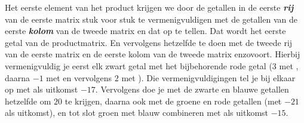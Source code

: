 Het eerste element van het product krijgen we door de getallen in de eerste \textit{\textbf{rij}} van de eerste matrix stuk voor stuk te vermenigvuldigen met de getallen van de eerste \textit{\textbf{kolom}} van de tweede matrix en dat op te tellen. Dat wordt het eerste getal van de productmatrix. En vervolgens hetzelfde te doen met de tweede rij van de eerste matrix en de eerste kolom van de tweede matrix enzovoort. 
Hierbij vermenigvuldig je eerst elk zwart getal  met het bijbehorende rode getal ($3$ met , daarna $-1$ met   en vervolgens $2$ met ). Die vermenigvuldigingen  tel je bij elkaar  op met als uitkomst $-17$. Vervolgens doe je met de zwarte en blauwe getallen  hetzelfde om $20$ te krijgen, daarna ook met de groene en rode getallen  (met $-21$ als uitkomst), en tot slot groen met blauw combineren met als uitkomst $-15$.

\newpage
